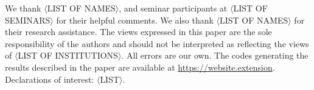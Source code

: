 \protect\linespread{1}\protect\selectfont
We thank \(\langle\)LIST OF NAMES\(\rangle\), and seminar participants at \(\langle\)LIST OF SEMINARS\(\rangle\) for their helpful comments. We also thank \(\langle\)LIST OF NAMES\(\rangle\) for their research assistance. The views expressed in this paper are the sole responsibility of the authors and should not be interpreted as reflecting the views of \(\langle\)LIST OF INSTITUTIONS\(\rangle\). All errors are our own. The codes generating the results described in the paper are available at \url{https://website.extension}. Declarations of interest: \(\langle\)LIST\(\rangle\).